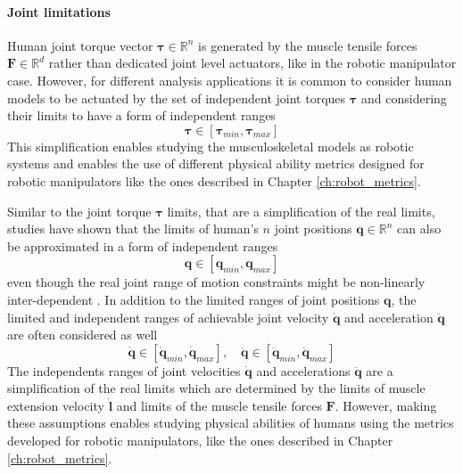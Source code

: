 \paragraph{Joint limitations} Human joint torque vector $\bm{\tau}\in\mathbb{R}^n$ is generated by the muscle tensile forces $\bm{F}\in \mathbb{R}^d$ rather than dedicated joint level actuators, like in the robotic manipulator case. However, for different analysis applications it is common to consider human models to be actuated by the set of independent joint torques $\bm{\tau}$ and considering their limits to have a form of independent ranges \cite{HOLZBAUR20072442}
\begin{equation}
    \bm{\tau} \in [\bm{\tau}_{min},\bm{\tau}_{max}]
    \label{eq:human_torque_lim}
\end{equation}
This simplification enables studying the musculoskeletal models as robotic systems and enables the use of different physical ability metrics designed for robotic manipulators like the ones described in Chapter \ref{ch:robot_metrics}. 

Similar to the joint torque $\bm{\tau}$ limits, that are a simplification of the real limits, studies have shown that the limits of human's $n$ joint positions $\bm{q} \in \mathbb{R}^n$ can also be approximated in a form of independent ranges \cite{SOUCIE2011}
\begin{equation}
    \bm{q} \in  [\bm{q}_{min}, \bm{q}_{max} ]
    \label{eq:human_js_pos_range}
\end{equation}
even though the real joint range of motion constraints might be non-linearly inter-dependent \cite{Kane2014}.
In addition to the limited ranges of joint positions $\bm{q}$, the limited and independent ranges of achievable joint velocity $\dot{\bm{q}}$ and acceleration $\ddot{\bm{q}}$ are often considered as well \cite{Grimmer2020}
\begin{equation}
    \dot{\bm{q}} \in  [\dot{\bm{q}}_{min}, \dot{\bm{q}}_{max} ], \quad \ddot{\bm{q}} \in  [\ddot{\bm{q}}_{min}, \ddot{\bm{q}}_{max} ]
    \label{eq:human_js_vel_lim}
\end{equation}
The independents ranges of joint velocities $\dot{\bm{q}}$ and accelerations $\ddot{\bm{q}}$ are a simplification of the real limits which are determined by the limits of muscle extension velocity $\dot{\bm{l}}$ and limits of the muscle tensile forces $\bm{F}$. However, making these assumptions enables studying physical abilities of humans using the metrics developed for robotic manipulators, like the ones described in Chapter \ref{ch:robot_metrics}. 


